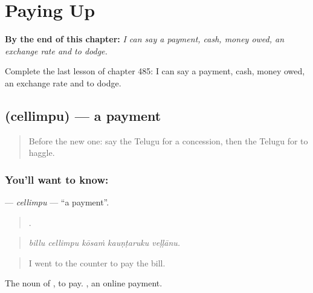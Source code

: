 
\chapter{Paying Up}
\label{ch:te-paying-up}

\begin{chapteropening}
\textbf{By the end of this chapter:} \emph{I can say a payment, cash, money owed, an exchange rate and to dodge.}

Complete the last lesson of chapter 485: I can say a payment, cash, money owed, an exchange rate and to dodge.
\end{chapteropening}

\section[\texorpdfstring{\te{చెల్లింపు} (cellimpu)}{చెల్లింపు (cellimpu)}]{ (cellimpu) — a payment}

\label{lesson:TE-C485-cellimpu}



\begin{quote}
Before the new one: say the Telugu for a concession, then the Telugu for to haggle.
\end{quote}

\subsection*{You'll want to know: }
\textbf{} — \emph{cellimpu} — \textquotedblleft{}a payment\textquotedblright{}.

\begin{quote}
    .
\end{quote}

\begin{quote}
\emph{billu cellimpu kōsaṁ kauṇṭaruku veḷḷānu.}
\end{quote}

\begin{quote}
I went to the counter to pay the bill.
\end{quote}

The noun of , to pay.  , an online payment.

